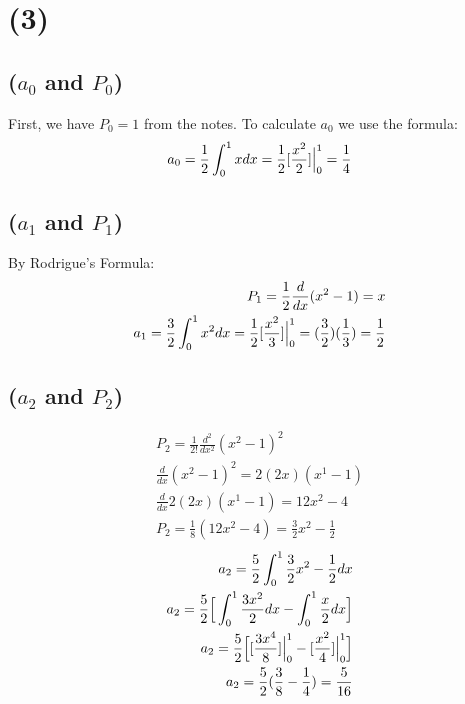 \documentclass{article}
\begin{document}
\section*{\textbf{(3)}}
\subsection*{\textbf{($a_0$ and $P_0$)}}
First, we have $P_0=1$ from the notes. To calculate $a_0$ we use the formula:
\begin{equation}
\begin{aligned}
a_0 = \frac{1}{2}\int_0^1xdx = \frac{1}{2}[\frac{x^2}{2}]\Big{|}^1_0 = \frac{1}{4}
\end{aligned}
\end{equation}
\subsection*{\textbf{($a_1$ and $P_1$)}}
By Rodrigue's Formula:
\begin{equation}
\begin{aligned}
P_1 = \frac{1}{2}\frac{d}{dx}(x^2-1) = x\\
a_1 = \frac{3}{2}\int_0^1x^2dx = \frac{1}{2}[\frac{x^2}{3}]\Big{|}^1_0 = (\frac{3}{2})(\frac{1}{3}) = \frac{1}{2}
\end{aligned}
\end{equation}
\subsection*{\textbf{($a_2$ and $P_2$)}}
\begin{equation}
\begin{aligned}
P_2 = \frac{1}{2!}\frac{d^2}{dx^2}(x^2-1)^2\\
\frac{d}{dx}(x^2-1)^2 = 2(2x)(x^1-1) \\
\frac{d}{dx}2(2x)(x^1-1) = 12x^2-4\\
P_2 = \frac{1}{8}(12x^2-4) = \frac{3}{2}x^2 - \frac{1}{2}
\end{aligned}
\end{equation}
\begin{equation}
\begin{aligned}
a_2 = \frac{5}{2}\int_0^1\frac{3}{2}x^2 - \frac{1}{2}dx\\
a_2 = \frac{5}{2}\Big{[}\int_0^1\frac{3x^2}{2}dx - \int_0^1\frac{x}{2}dx \Big{]}\\
a_2 = \frac{5}{2}\Big{[}[\frac{3x^4}{8}]\Big{|}_0^1 - [\frac{x^2}{4}]\Big{|}_0^1 \Big{]}\\
a_2 = \frac{5}{2} (\frac{3}{8} - \frac{1}{4}) = \frac{5}{16}
\end{aligned}
\end{equation}
\end{document}
